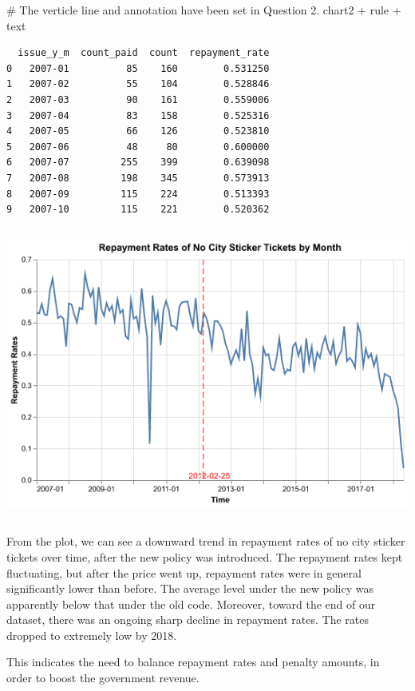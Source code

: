 \documentclass[
  letterpaper,
  DIV=11,
  numbers=noendperiod]{scrartcl}
\newenvironment{Shaded}{\begin{snugshade}}{\end{snugshade}}
\newcommand{\CommentTok}[1]{\textcolor[rgb]{0.37,0.37,0.37}{#1}}
\newcommand{\NormalTok}[1]{\textcolor[rgb]{0.00,0.23,0.31}{#1}}
\newcommand{\OperatorTok}[1]{\textcolor[rgb]{0.37,0.37,0.37}{#1}}
\begin{document}
\begin{Shaded}
\begin{Highlighting}[]
\CommentTok{\# The verticle line and annotation have been set in Question 2.}
\NormalTok{chart2 }\OperatorTok{+}\NormalTok{ rule }\OperatorTok{+}\NormalTok{ text}
\end{Highlighting}
\end{Shaded}

\begin{verbatim}
  issue_y_m  count_paid  count  repayment_rate
0   2007-01          85    160        0.531250
1   2007-02          55    104        0.528846
2   2007-03          90    161        0.559006
3   2007-04          83    158        0.525316
4   2007-05          66    126        0.523810
5   2007-06          48     80        0.600000
6   2007-07         255    399        0.639098
7   2007-08         198    345        0.573913
8   2007-09         115    224        0.513393
9   2007-10         115    221        0.520362
\end{verbatim}

\includegraphics[width=5.70833in,height=3.79167in]{PS2 Answer_files/figure-pdf/cell-11-output-2.png}

From the plot, we can see a downward trend in repayment rates of no city
sticker tickets over time, after the new policy was introduced. The
repayment rates kept fluctuating, but after the price went up, repayment
rates were in general significantly lower than before. The average level
under the new policy was apparently below that under the old code.
Moreover, toward the end of our dataset, there was an ongoing sharp
decline in repayment rates. The rates dropped to extremely low by 2018.

This indicates the need to balance repayment rates and penalty amounts,
in order to boost the government revenue.
\end{document}
